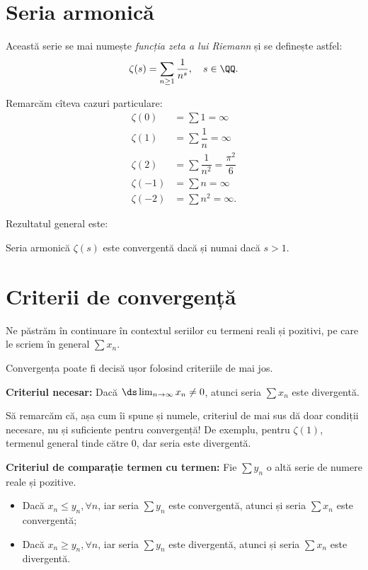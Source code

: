 \section{Seria armonică}

Această serie se mai numește \emph{funcția zeta a lui Riemann} și se
definește astfel:
\[
    \zeta(s) = \sum_{n \geq 1} \dfrac{1}{n^s}, \quad s \in \QQ.
\]

Remarcăm cîteva cazuri particulare:
\begin{align*}
    \zeta(0) &= \sum 1 = \infty \\
    \zeta(1) &= \sum \dfrac{1}{n} = \infty \\
    \zeta(2) &= \sum \dfrac{1}{n^2} = \dfrac{\pi^2}{6} \\
    \zeta(-1) &= \sum n = \infty \\
    \zeta(-2) &= \sum n^2 = \infty.
\end{align*}

Rezultatul general este:
\begin{theorem}\label{thm:zeta-conv}
    Seria armonică $ \zeta(s) $ este convergentă dacă și numai dacă
    $ s > 1 $.
\end{theorem}

\section{Criterii de convergență}

Ne păstrăm în continuare în contextul seriilor cu termeni reali și pozitivi,
pe care le scriem în general $ \sum x_n $.

Convergența poate fi decisă ușor folosind criteriile de mai jos.

\textbf{Criteriul necesar:} Dacă $ \ds\lim_{n \to \infty} x_n \neq 0 $, atunci
seria $ \sum x_n $ este divergentă.

\begin{remark}\label{rk:nec}
    Să remarcăm că, așa cum îi spune și numele, criteriul de mai sus dă doar
    condiții necesare, nu și suficiente pentru convergență! De exemplu, pentru
    $ \zeta(1) $, termenul general tinde către 0, dar seria este divergentă.
\end{remark}

\vspace{1cm}

\textbf{Criteriul de comparație termen cu termen:} Fie $ \sum y_n $ o altă serie
de numere reale și pozitive.
\begin{itemize}
    \item Dacă $ x_n \leq y_n, \forall n $, iar seria $ \sum y_n $ este convergentă,
        atunci și seria $ \sum x_n $ este convergentă;
    \item Dacă $ x_n \geq y_n, \forall n $, iar seria $ \sum y_n $ este divergentă,
        atunci și seria $ \sum x_n $ este divergentă.
\end{itemize}

